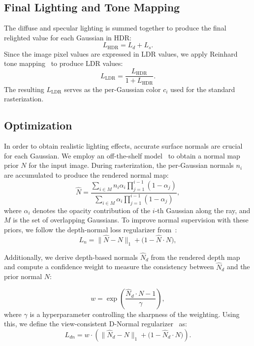\documentclass[letterpaper, 10 pt, conference]{ieeeconf}  %
\begin{document}
\subsection{Final Lighting and Tone Mapping}
The diffuse and specular lighting is summed together to produce the final relighted value for each Gaussian in HDR:
\begin{equation}
    L_{\text{HDR}} = L_{d} + L_{s}.
\end{equation}
Since the image pixel values are expressed in LDR values, we apply Reinhard tone mapping~\cite{reinhard2023photographic} to produce LDR values:
\begin{equation}
    L_{\text{LDR}} = \frac{L_{\text{HDR}}}{1 + L_{\text{HDR}}}.
\end{equation}
The resulting \(L_{\text{LDR}}\) serves as the per-Gaussian color \(c_i\) used for the standard rasterization.

 
\subsection{Optimization}



In order to obtain realistic lighting effects, accurate surface normals are crucial for each Gaussian. We employ an off-the-shelf model~\cite{wang2025moge} to obtain a normal map prior $N$ for the input image. During rasterization, the per-Gaussian normals $n_i$ are accumulated to produce the rendered normal map:
\begin{equation}
\hat{N} =
\frac{
\sum_{i \in M} n_i \alpha_i \prod_{j=1}^{i-1} (1 - \alpha_j)
}{
\sum_{i \in M} \alpha_i \prod_{j=1}^{i-1} (1 - \alpha_j)
},
\label{eq:weighted_normal}
\end{equation}
where $\alpha_i$ denotes the opacity contribution of the $i$-th Gaussian along the ray, and $M$ is the set of overlapping Gaussians.
%
To improve normal supervision with these priors, we follow the depth-normal loss regularizer from~\cite{chen2024vcr}:
\begin{equation}
L_n = \lVert \hat{N} - N \rVert_1 + \big(1 - \hat{N} \cdot N \big),
\label{eq:normal_loss}
\end{equation}

Additionally, we derive depth-based normals $\hat{N}_d$ from the rendered depth map and compute a confidence weight to measure the consistency between $\hat{N}_d$ and the prior normal $N$:

\begin{equation}
w = \exp \left( \frac{\hat{N}_d \cdot N - 1}{\gamma} \right),
\label{eq:confidence}
\end{equation}
where $\gamma$ is a hyperparameter controlling the sharpness of the weighting. Using this, we define the view-consistent D-Normal regularizer~\cite{chen2024vcr} as:
\begin{equation}
L_{dn} = w \cdot \left( \lVert \hat{N}_d - N \rVert_1 + \big( 1 - \hat{N}_d \cdot N \big) \right).
\label{eq:view_consistent_dn}
\end{equation}
\end{document}
